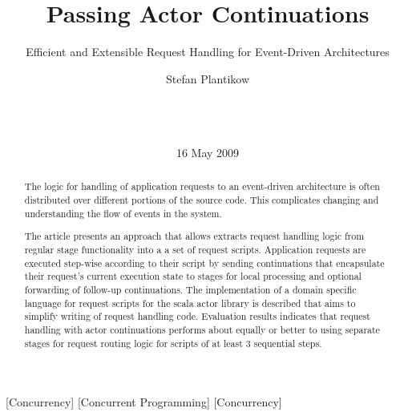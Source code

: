 \documentclass{sig-alternate}
\begin{document}

\title{Passing Actor Continuations}
\subtitle{Efficient and Extensible Request Handling for Event-Driven Architectures}


\author{
\alignauthor
Stefan Plantikow\\
       \\
       \\
       \\
}

\date{16 May 2009}


\maketitle

\begin{abstract}

The logic for handling of application requests to an event-driven architecture is often distributed
over different portions of the source code. This complicates changing and understanding the flow
of events in the system.

The article presents an approach that allows extracts request handling logic from regular stage
functionality into a a set of request scripts. Application requests are executed step-wise according
to their script by sending continuations that encapsulate their request's current execution state to
stages for local processing and optional forwarding of follow-up continuations. The implementation
of a domain specific language for request scripts for the scala actor library is described that aims
to simplify writing of request handling code. Evaluation results indicates that request handling
with actor continuations performs about equally or better to using separate stages for request
routing logic for scripts of at least 3 sequential steps.

\end{abstract}

[Concurrency]         
[Concurrent Programming]         
[Concurrency]
\end{document}
